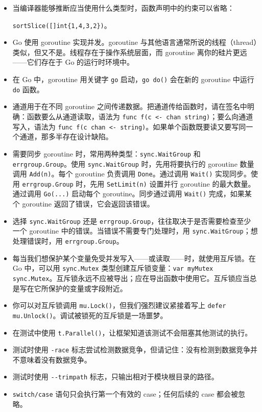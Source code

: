 \begin{itemize}
\begin{gocode}[]
var hashIndex[T myConstraint] map[uint]T
func sortSlice[T constraints.Ordered](t []T) ([]T, error)
\end{gocode}
\item 当编译器能够推断应当使用什么类型时，函数声明中的约束可以省略：\par\texttt{sortSlice([]int\{1,4,3,2\})}。
\item Go 使用 goroutine 实现并发。goroutine 与其他语言通常所说的线程（thread）类似，但又不是。线程存在于操作系统层面，而 goroutine 离你的硅片更远——它们存在于 Go 的运行时环境中。
\item 在 Go 中，goroutine 用关键字 \texttt{go} 启动，\texttt{go do()} 会在新的 goroutine 中运行 \texttt{do} 函数。
\item 通道用于在不同 goroutine 之间传递数据。把通道传给函数时，请在签名中明确：函数要么从通道读取，语法为 \texttt{func f(c <- chan string)}；要么向通道写入，语法为 \texttt{func f(c chan <- string)}。如果单个函数既要读又要写同一个通道，那多半存在设计缺陷。
\item 需要同步 goroutine 时，常用两种类型：\texttt{sync.WaitGroup} 和 \texttt{errgroup.Group}。使用 \texttt{sync.WaitGroup} 时，先用将要执行的 goroutine 数量调用 \texttt{Add(n)}。每个 goroutine 负责调用 \texttt{Done}。通过调用 \texttt{Wait()} 实现同步。使用 \texttt{errgroup.Group} 时，先用 \texttt{SetLimit(n)} 设置并行 goroutine 的最大数量。通过调用 \texttt{Go(...)} 启动每个 goroutine。同步通过调用 \texttt{Wait()} 完成，如果某个 goroutine 返回了错误，它会返回该错误。
\item 选择 \texttt{sync.WaitGroup} 还是 \texttt{errgroup.Group}，往往取决于是否需要检查至少一个 goroutine 中的错误。当错误不需要专门处理时，用 \texttt{sync.WaitGroup}；想处理错误时，用 \texttt{errgroup.Group}。
\item 每当我们想保护某个变量免受并发写入——或读取——时，就使用互斥锁。在 Go 中，可以用 \texttt{sync.Mutex} 类型创建互斥锁变量：\texttt{var myMutex sync.Mutex}。互斥锁永远不应被导出；应在导出函数中使用它。互斥锁应当总是写在它所保护的变量或字段附近。
\item 你可以对互斥锁调用 \texttt{mu.Lock()}，但我们强烈建议紧接着写上 \texttt{defer mu.Unlock()}。调试被锁死的互斥锁是一场噩梦。
\item 在测试中使用 \texttt{t.Parallel()}，让框架知道该测试不会阻塞其他测试的执行。
\item 测试时使用 \texttt{-race} 标志尝试检测数据竞争，但请记住：没有检测到数据竞争并不意味着没有数据竞争。
\item 测试时使用 \texttt{-\--trimpath} 标志，只输出相对于模块根目录的路径。
\item \texttt{switch/case} 语句只会执行第一个有效的 case；任何后续的 case 都会被忽略。
\end{itemize}
